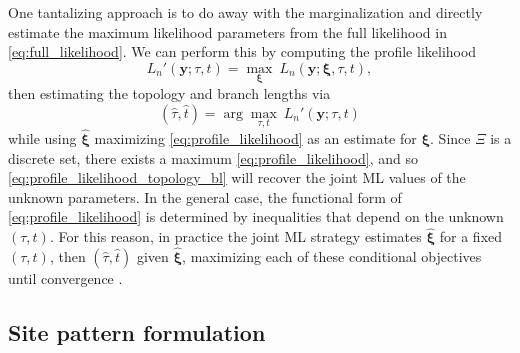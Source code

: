 \documentclass[a4paper]{article}
\begin{document}
One tantalizing approach is to do away with the marginalization and directly estimate the maximum likelihood parameters from the full likelihood in \eqref{eq:full_likelihood}.
We can perform this by computing the profile likelihood
\begin{equation}
\label{eq:profile_likelihood}
L_n'(\mathbf{y};\tau, t) = \max_{\boldsymbol\xi} \ L_n(\mathbf{y};\boldsymbol\xi, \tau, t),
\end{equation}
then estimating the topology and branch lengths via
\begin{equation}
\label{eq:profile_likelihood_topology_bl}
(\hat{\tau}, \hat{t}) = \arg\max_{\tau, t} \ L_n'(\mathbf{y};\tau, t)
\end{equation}
while using $\hat{\boldsymbol\xi}$ maximizing \eqref{eq:profile_likelihood} as an estimate for $\boldsymbol\xi$.
Since $\Xi$ is a discrete set, there exists a maximum \eqref{eq:profile_likelihood}, and so \eqref{eq:profile_likelihood_topology_bl} will recover the joint ML values of the unknown parameters.
In the general case, the functional form of \eqref{eq:profile_likelihood} is determined by inequalities that depend on the unknown $(\tau,t)$.
For this reason, in practice the joint ML strategy estimates $\hat{\boldsymbol\xi}$ for a fixed $(\tau,t)$, then $(\hat{\tau},\hat{t})$ given $\hat{\boldsymbol\xi}$, maximizing each of these conditional objectives until convergence \cite{Neher2017}.

\subsection{Site pattern formulation}
\end{document}
